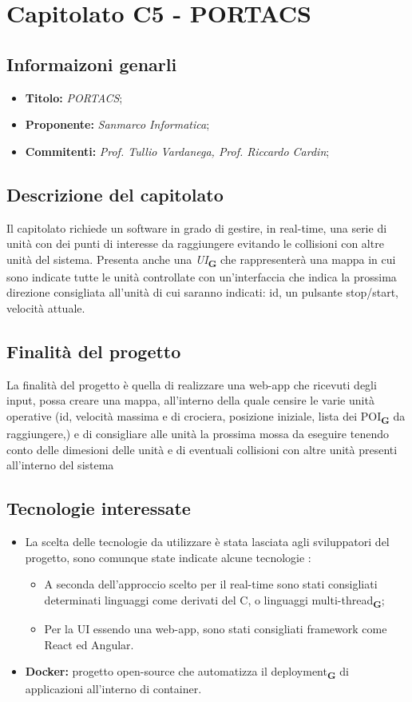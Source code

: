 \section{Capitolato C5 - PORTACS}
\subsection{Informaizoni genarli}
\begin{itemize}
    \item \textbf{Titolo:} \textit{PORTACS};
    \item \textbf{Proponente:} \textit{Sanmarco Informatica};
    \item \textbf{Commitenti:} \textit{Prof. Tullio Vardanega, Prof. Riccardo Cardin};
\end{itemize}
\subsection{Descrizione del capitolato}
Il capitolato richiede un software in grado di gestire, in real-time, una serie di unità con dei punti di interesse da raggiungere evitando le collisioni con altre unità del sistema. 
Presenta anche una \textit{UI}\textsubscript{\textbf{G}} che rappresenterà una mappa in cui sono indicate tutte le unità controllate con un'interfaccia che indica la prossima direzione consigliata all'unità di cui saranno indicati: id, un pulsante stop/start, velocità attuale.
\subsection{Finalità del progetto}
La finalità del progetto è quella di realizzare una web-app che ricevuti degli input, possa creare una mappa, all'interno della quale censire le varie unità operative (id, velocità massima e di crociera, posizione iniziale, lista dei POI\textsubscript{\textbf{G}} da raggiungere,) e di consigliare alle unità la prossima mossa da eseguire tenendo conto delle dimesioni delle unità e di eventuali collisioni con altre unità presenti all'interno del sistema 
\subsection{Tecnologie interessate}
\begin{itemize}
    \item La scelta delle tecnologie da utilizzare è stata lasciata agli sviluppatori del progetto, sono comunque state indicate alcune tecnologie :
    \begin{itemize}
        \item A seconda dell'approccio scelto per il real-time sono stati consigliati determinati linguaggi come derivati del C, o linguaggi multi-thread\textsubscript{\textbf{G}};
        \item Per la UI essendo una web-app, sono stati consigliati framework come React ed Angular.
    \end{itemize}
    \item \textbf{Docker:} progetto open-source che automatizza il deployment\textsubscript{\textbf{G}} di applicazioni all’interno di container.
\end{itemize}
